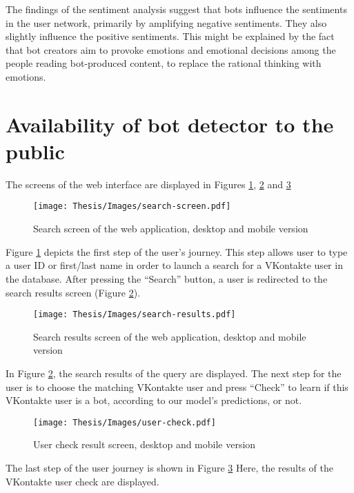 The findings of the sentiment analysis suggest that bots influence the sentiments in the user network, primarily by amplifying negative sentiments. They also slightly influence the positive sentiments. This might be explained by the fact that bot creators aim to provoke emotions and emotional decisions among the people reading bot-produced content, to replace the rational thinking with emotions. 


\section{Availability of bot detector to the public}
The screens of the web interface are displayed in Figures \ref{fig:search-screen}, \ref{fig:search-results} and \ref{fig:user-check} 

\begin{figure}
	\centering
	\texttt{[image: Thesis/Images/search-screen.pdf]}
	\caption{Search screen of the web application, desktop and mobile version}
	\label{fig:search-screen}
\end{figure}

Figure \ref{fig:search-screen} depicts the first step of the user’s journey. This step allows user to type a user ID or first/last name in order to launch a search for a VKontakte user in the database. After pressing the ``Search'' button, a user is redirected to the search results screen (Figure \ref{fig:search-results}).
\begin{figure}
	\centering
	\texttt{[image: Thesis/Images/search-results.pdf]}
	\caption{Search results screen of the web application, desktop and mobile version}
	\label{fig:search-results}
\end{figure}

In Figure \ref{fig:search-results}, the search results of the query are displayed. The next step for the user is to choose the matching VKontakte user and press ``Check'' to learn if this VKontakte user is a bot, according to our model’s predictions, or not.

\begin{figure}
	\centering
	\texttt{[image: Thesis/Images/user-check.pdf]}
	\caption{User check result screen, desktop and mobile version}
	\label{fig:user-check}
\end{figure}

The last step of the user journey is shown in Figure \ref{fig:user-check} Here, the results of the VKontakte user check are displayed.

